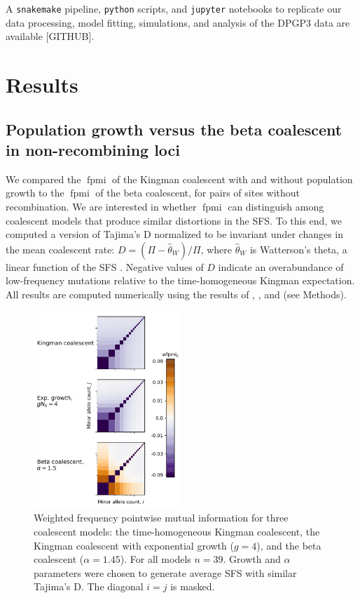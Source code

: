 \documentclass[11pt, letterpaper]{article}   	%
\DeclareMathOperator{\fpmi}{fpmi}
\begin{document}
A \texttt{snakemake} pipeline, \texttt{python} scripts, and \texttt{jupyter} notebooks to replicate our data processing, model fitting, simulations, and analysis of the DPGP3 data are available [GITHUB].

\section*{Results \label{sec:results}}

\subsection*{Population growth versus the beta coalescent in non-recombining loci}

We compared the $\fpmi$ of the Kingman coalescent with and without population growth to the $\fpmi$ of the beta coalescent, for pairs of sites without recombination.
We are interested in whether $\fpmi$ can distinguish among coalescent models that produce similar distortions in the SFS.
To this end, we computed a version of Tajima's D \autocite{Tajima1983} normalized to be invariant under changes in the mean coalescent rate: $D = (\Pi - \hat{\theta}_W) / \Pi$, where $\hat{\theta}_W$ is Watterson's theta, a linear function of the SFS \autocite{Watterson19??}.
Negative values of $D$ indicate an overabundance of low-frequency mutations relative to the time-homogeneous Kingman expectation.
All results are computed numerically using the results of \cite{Fu1995}, \cite{ZivkovicWiehe2008}, and \cite{BirknerEtAl2013} (see Methods).

\begin{figure}
\centering
\includegraphics[width=0.5\textwidth]{figures/wfpmi_growth_beta.pdf}
\caption{Weighted frequency pointwise mutual information for three coalescent models: the time-homogeneous Kingman coalescent, the Kingman coalescent with exponential growth ($g=4$), and the beta coalescent ($\alpha=1.45$). For all models $n=39$. Growth and $\alpha$ parameters were chosen to generate average SFS with similar Tajima's D. The diagonal $i=j$ is masked. \label{fig:nonrecombining_pmi}}
\end{figure}
\end{document}
